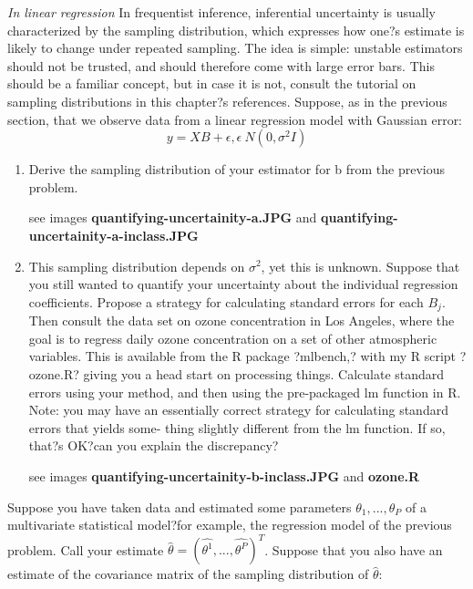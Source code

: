 \documentclass{homework}
\begin{document}
\textit{In linear regression}
In frequentist inference, inferential uncertainty is usually characterized by the sampling distribution, which expresses how one?s estimate is likely to change under repeated sampling. The idea is simple: unstable estimators should not be trusted, and should therefore come with large
error bars. This should be a familiar concept, but in case it is not, consult the tutorial on sampling distributions in this chapter?s references.
Suppose, as in the previous section, that we observe data from a linear regression model with Gaussian error:
$$y = XB + \epsilon ,    \epsilon ~ N(0,\sigma^2I)$$

\begin{enumerate}[label=(\Alph*)]
\item Derive the sampling distribution of your estimator for b from the previous problem.
\par * see images \textbf{quantifying-uncertainity-a.JPG}  and \textbf{quantifying-uncertainity-a-inclass.JPG}

\item This sampling distribution depends on $\sigma^2$, yet this is unknown. Suppose that you still wanted to quantify your uncertainty about the individual regression coefficients. Propose a strategy for calculating standard errors for each $B_j$. Then consult the data set on ozone concentration in Los Angeles, where the goal is to regress daily ozone concentration on a set of other atmospheric variables. This is available from the R package ?mlbench,? with my R script ?ozone.R? giving you a head start on processing things.
Calculate standard errors using your method, and then using the pre-packaged lm function in R. Note: you may have an essentially correct strategy for calculating standard errors that yields some- thing slightly different from the lm function. If so, that?s OK?can you explain the discrepancy?
\par * see images \textbf{quantifying-uncertainity-b-inclass.JPG}  and \textbf{ozone.R}

\end{enumerate}

Suppose you have taken data and estimated some parameters $\theta_1, . . . , \theta_P$ of a multivariate statistical model?for example, the regression model of the previous problem. Call your estimate $\hat{\theta} = (\hat{\theta^1}, . . . , \hat{\theta^P})^T$. Suppose that you also have an estimate of the covariance matrix of the sampling distribution of $\hat{\theta}$:
\end{document}
